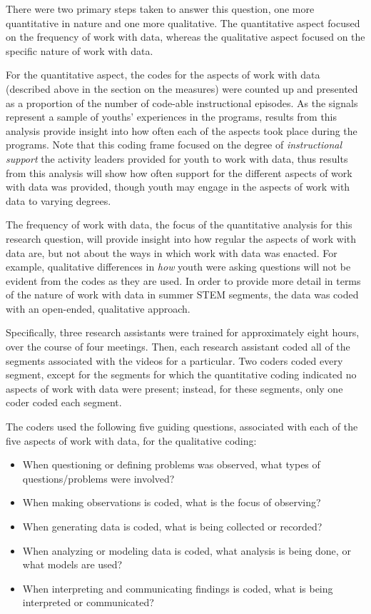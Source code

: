 \documentclass[]{book}
\providecommand{\tightlist}{%
  \setlength{\itemsep}{0pt}\setlength{\parskip}{0pt}}
\theoremstyle{definition}
\theoremstyle{definition}
\theoremstyle{definition}
\theoremstyle{remark}
\begin{document}
There were two primary steps taken to answer this question, one more
quantitative in nature and one more qualitative. The quantitative aspect
focused on the frequency of work with data, whereas the qualitative
aspect focused on the specific nature of work with data.

For the quantitative aspect, the codes for the aspects of work with data
(described above in the section on the measures) were counted up and
presented as a proportion of the number of code-able instructional
episodes. As the signals represent a sample of youths' experiences in
the programs, results from this analysis provide insight into how often
each of the aspects took place during the programs. Note that this
coding frame focused on the degree of \emph{instructional support} the
activity leaders provided for youth to work with data, thus results from
this analysis will show how often support for the different aspects of
work with data was provided, though youth may engage in the aspects of
work with data to varying degrees.

The frequency of work with data, the focus of the quantitative analysis
for this research question, will provide insight into how regular the
aspects of work with data are, but not about the ways in which work with
data was enacted. For example, qualitative differences in \emph{how}
youth were asking questions will not be evident from the codes as they
are used. In order to provide more detail in terms of the nature of work
with data in summer STEM segments, the data was coded with an
open-ended, qualitative approach.

Specifically, three research assistants were trained for approximately
eight hours, over the course of four meetings. Then, each research
assistant coded all of the segments associated with the videos for a
particular. Two coders coded every segment, except for the segments for
which the quantitative coding indicated no aspects of work with data
were present; instead, for these segments, only one coder coded each
segment.

The coders used the following five guiding questions, associated with
each of the five aspects of work with data, for the qualitative coding:

\begin{itemize}
\tightlist
\item
  When questioning or defining problems was observed, what types of
  questions/problems were involved?
\item
  When making observations is coded, what is the focus of observing?
\item
  When generating data is coded, what is being collected or recorded?
\item
  When analyzing or modeling data is coded, what analysis is being done,
  or what models are used?
\item
  When interpreting and communicating findings is coded, what is being
  interpreted or communicated?
\end{itemize}
\end{document}
